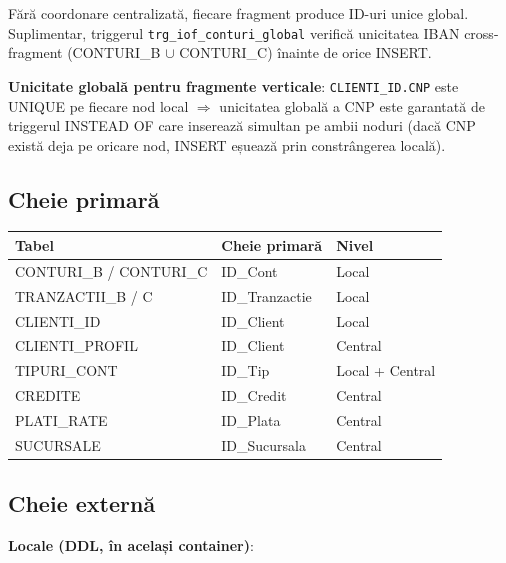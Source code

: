 \documentclass[12pt,a4paper]{article}
\begin{document}
Fără coordonare centralizată, fiecare fragment produce ID-uri unice global.
Suplimentar, triggerul \texttt{trg\_iof\_conturi\_global} verifică unicitatea IBAN
cross-fragment (CONTURI\_B $\cup$ CONTURI\_C) înainte de orice INSERT.

\textbf{Unicitate globală pentru fragmente verticale}:
\texttt{CLIENTI\_ID.CNP} este UNIQUE pe fiecare nod local $\Rightarrow$ unicitatea globală a CNP
este garantată de triggerul INSTEAD OF care inserează simultan pe ambii noduri
(dacă CNP există deja pe oricare nod, INSERT eșuează prin constrângerea locală).

\subsection{Cheie primară}

\begin{center}
\begin{tabular}{lll}
\toprule
\textbf{Tabel} & \textbf{Cheie primară} & \textbf{Nivel} \\
\midrule
CONTURI\_B / CONTURI\_C & ID\_Cont & Local \\
TRANZACTII\_B / C & ID\_Tranzactie & Local \\
CLIENTI\_ID & ID\_Client & Local \\
CLIENTI\_PROFIL & ID\_Client & Central \\
TIPURI\_CONT & ID\_Tip & Local + Central \\
CREDITE & ID\_Credit & Central \\
PLATI\_RATE & ID\_Plata & Central \\
SUCURSALE & ID\_Sucursala & Central \\
\bottomrule
\end{tabular}
\end{center}

\subsection{Cheie externă}

\textbf{Locale (DDL, în același container)}:
\end{document}
